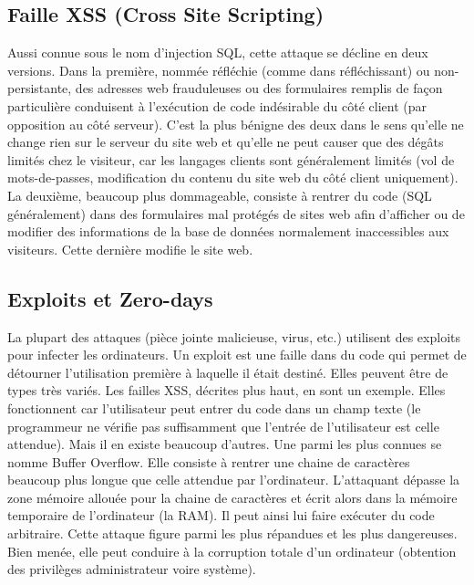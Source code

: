 \documentclass[article, french]{yReport}
\begin{document}
	\subsection{Faille XSS (Cross Site Scripting)}
	Aussi connue sous le nom d'injection SQL, cette attaque se décline en deux versions.
	Dans la première, nommée réfléchie (comme dans réfléchissant) ou non-persistante, des adresses web frauduleuses ou des formulaires remplis de façon particulière conduisent à l'exécution de code indésirable du côté client (par opposition au côté serveur).
	C'est la plus bénigne des deux dans le sens qu'elle ne change rien sur le serveur du site web et qu'elle ne peut causer que des dégâts limités chez le visiteur, car les langages clients sont généralement limités (vol de mots-de-passes, modification du contenu du site web du côté client uniquement).
	La deuxième, beaucoup plus dommageable, consiste à rentrer du code (SQL généralement) dans des formulaires mal protégés de sites web afin d'afficher ou de modifier des informations de la base de données normalement inaccessibles aux visiteurs.
	Cette dernière modifie le site web.
	
	\subsection{Exploits et Zero-days}
	\label{sec:exploits}
	La plupart des attaques (pièce jointe malicieuse, virus, etc.) utilisent des exploits pour infecter les ordinateurs.
	Un exploit est une faille dans du code qui permet de détourner l'utilisation première à laquelle il était destiné.
	Elles peuvent être de types très variés.
	Les failles XSS, décrites plus haut, en sont un exemple.
	Elles fonctionnent car l'utilisateur peut entrer du code dans un champ texte (le programmeur ne vérifie pas suffisamment que l'entrée de l'utilisateur est celle attendue).
	Mais il en existe beaucoup d'autres.
	Une parmi les plus connues se nomme Buffer Overflow.
	Elle consiste à rentrer une chaine de caractères beaucoup plus longue que celle attendue par l'ordinateur.
	L'attaquant dépasse la zone mémoire allouée pour la chaine de caractères et écrit alors dans la mémoire temporaire de l'ordinateur (la RAM).
	Il peut ainsi lui faire exécuter du code arbitraire.
	Cette attaque figure parmi les plus répandues et les plus dangereuses.
	Bien menée, elle peut conduire à la corruption totale d'un ordinateur (obtention des privilèges administrateur voire système).
	
\end{document}
